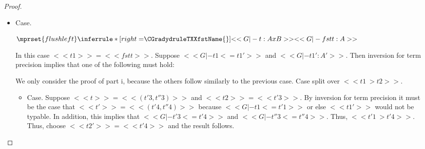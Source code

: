 \begin{proof}
\begin{itemize}
\begin{itemize}
  \item[] Case.  Suppose a congruence rule was used.  Then $<<t2>> = <<case t'' : Nat of 0 -> t3'', (succ x) -> t4''>>$.
    This case will follow straightforwardly by induction and a case split over which congruence rule was used.    
  \end{itemize}

  \ \\
  \noindent
  \textbf{Proof of part ii.}  Suppose $<<t1'>> = <<box A t1>>$, $<<G |- t1 : A>>$, and $<<t1 ~> t2>>$.
  Then choose $<<t'2>> = <<box A t2>>$, and the result follows, because we know by type preservation
  that $<<G |- t2 : A>>$, and hence, $<<G |- t2 <= t2'>>$.

  \ \\
  \noindent
  \textbf{Proof of part iii.}  Similar to the previous case.  

\item[] Case.\ \\ 
  \begin{center}
    \begin{math}
      $$\mprset{flushleft}
      \inferrule* [right=$\CGradydruleTXXfstName{}$] {
        <<G |- t : A x B>>
      }{<<G |- fst t : A>>}
    \end{math}
  \end{center}
  In this case $<<t1>> = <<fst t>>$.  Suppose $<<G |- t1 <= t1'>>$ and $<<G |- t1' : A'>>$.
  Then inversion for term precision implies that one of the following must hold:

  We only consider the proof of part i, because the others follow similarly to
  the previous case. Case split over $<<t1 ~> t2>>$.
  \begin{itemize}
  \item[] Case. Suppose $<<t>> = <<(t'3,t''3)>>$ and $<<t2>> = <<t'3>>$.  By inversion for term precision it must be the case
    that $<<t'>> = <<(t'4,t''4)>>$ because $<<G |- t1 <= t'1>>$ or else $<<t1'>>$ would not be typable.  In addition,
    this implies that $<<G |- t'3 <= t'4>>$ and $<<G |- t''3 <= t''4>>$.
    Thus, $<<t'1 ~> t'4>>$. Thus, choose $<<t2'>> = <<t'4>>$ and the result follows.


\end{itemize}
\end{itemize}
\end{proof}
